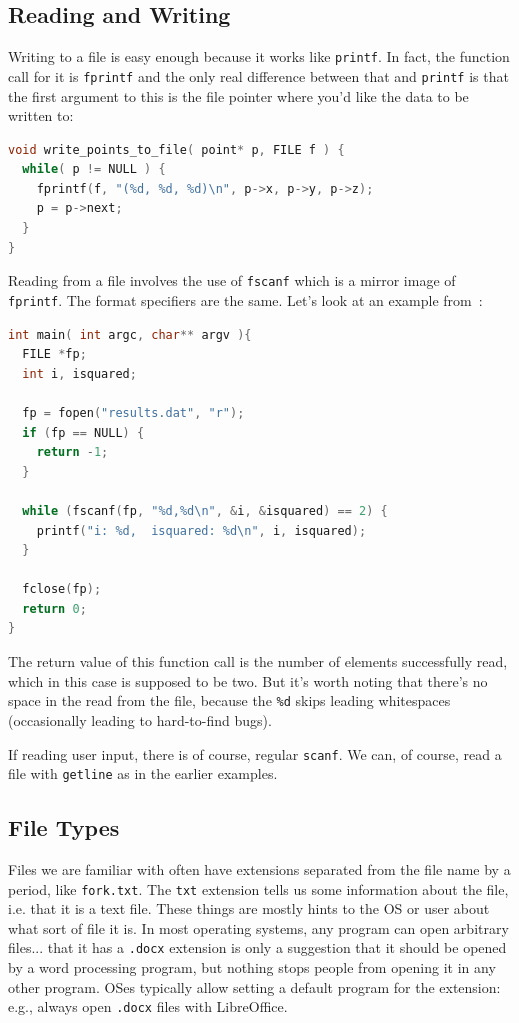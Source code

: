 \documentclass[a4paper]{report}
\begin{document}
\subsection*{Reading and Writing}

Writing to a file is easy enough because it works like \texttt{printf}. In fact, the function call for it is \texttt{fprintf} and the only real difference between that and \texttt{printf} is that the first argument to this is the file pointer where you'd like the data to be written to:

\begin{lstlisting}[language=C]
void write_points_to_file( point* p, FILE f ) {
  while( p != NULL ) {
    fprintf(f, "(%d, %d, %d)\n", p->x, p->y, p->z);
    p = p->next;
  }
}
\end{lstlisting}

Reading from a file involves the use of \texttt{fscanf} which is a mirror image of \texttt{fprintf}. The format specifiers are the same. Let's look at an example from~\cite{cfiles}:

\begin{lstlisting}[language=C]
int main( int argc, char** argv ){
  FILE *fp;
  int i, isquared;
   
  fp = fopen("results.dat", "r");
  if (fp == NULL) {
    return -1;
  }
   
  while (fscanf(fp, "%d,%d\n", &i, &isquared) == 2) {
    printf("i: %d,  isquared: %d\n", i, isquared);
  }
  
  fclose(fp);
  return 0;
}
\end{lstlisting}

The return value of this function call is the number of elements successfully read, which in this case is supposed to be two. But it's worth noting that there's no space in the read from the file, because the \texttt{\%d} skips leading whitespaces (occasionally leading to hard-to-find bugs).

If reading user input, there is of course, regular \texttt{scanf}. We can, of course, read a file with \texttt{getline} as in the earlier examples.

\subsection*{File Types}

Files we are familiar with often have extensions separated from the file name by a period, like \texttt{fork.txt}. The \texttt{txt} extension tells us some information about the file, i.e. that it is a text file. These things are mostly hints to the OS or user about what sort of file it is. In most operating systems, any program can open arbitrary files... that it has a \texttt{.docx} extension is only a suggestion that it should be opened by a word processing program, but nothing stops people from opening it in any other program. OSes typically allow setting a default program for the extension: e.g., always open \texttt{.docx} files with LibreOffice.
\end{document}
